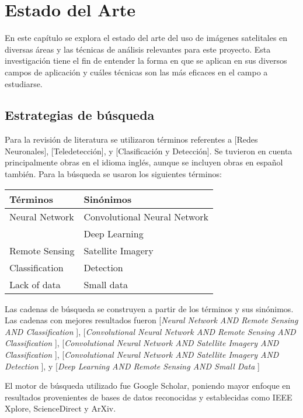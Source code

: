 \section{Estado del Arte}

En este capítulo se explora el estado del arte del uso de imágenes satelitales en diversas áreas y las técnicas de análisis relevantes para este proyecto. Esta investigación tiene el fin de entender la forma en que se aplican en sus diversos campos de aplicación y cuáles técnicas son las más eficaces en el campo a estudiarse.

\subsection{Estrategias de búsqueda}

Para la revisión de literatura se utilizaron términos referentes a [Redes Neuronales], [Teledetección], y [Clasificación y Detección]. Se tuvieron en cuenta principalmente obras en el idioma inglés, aunque se incluyen obras en español también. Para la búsqueda se usaron los siguientes términos:

\begin{center}
    \begin{tabular}{ l | l }
        {\bf Términos } & {\bf Sinónimos } \\
        \hline
        Neural Network & Convolutional Neural Network \\
                       & Deep Learning \\
        \hline
        Remote Sensing & Satellite Imagery \\
        \hline
        Classification & Detection \\
        \hline
        Lack of data & Small data \\
    \end{tabular}
\end{center}

Las cadenas de búsqueda se construyen a partir de los términos y sus sinónimos. Las cadenas con mejores resultados fueron
[{\it Neural Network AND Remote Sensing AND Classification }],
[{\it Convolutional Neural Network AND Remote Sensing AND Classification }],
[{\it Convolutional Neural Network AND Satellite Imagery AND Classification }],
[{\it Convolutional Neural Network AND Satellite Imagery AND Detection }], y
[{\it Deep Learning AND Remote Sensing AND Small Data }]

El motor de búsqueda utilizado fue Google Scholar, poniendo mayor enfoque en resultados provenientes de bases de datos reconocidas y establecidas como IEEE Xplore, ScienceDirect y ArXiv.

